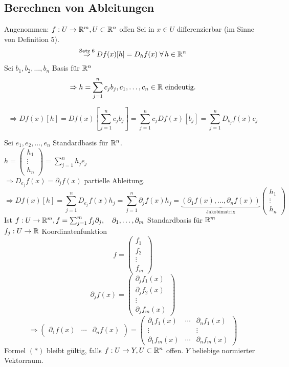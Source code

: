 \documentclass[../ana2.tex]{subfiles}
\begin{document}
\subsection{Berechnen von Ableitungen}
Angenommen: \( f:U\rightarrow \mathbb{R}^m, U \subset \mathbb{R}^n \) offen
Sei in \( x \in U \) differenzierbar (im Sinne von Definition 5).
\[ \oversett{Satz 6}{\Rightarrow} Df(x)[h] = D_hf(x) \; \forall h \in \R^n \]
Sei \( b_1, b_2, \dots, b_n \) Basis für \( \mathbb{R}^n \)
\[ \Rightarrow h = \sum_{j=1}^n c_j b_j, c_1, \ldots, c_n \in \mathbb{R} \text{ eindeutig.} \]

\[ \Rightarrow Df(x)[h] = Df(x)[\sum_{j=1}^n c_j b_j]
= \sum_{j=1}^n  c_j Df(x)[b_j]
= \sum_{j=1}^n D_{b_j} f(x)c_j \]

Sei \( e_1, e_2, \dots, e_n \) Standardbasis für \(\mathbb{R}^n\).\\
\( h = \begin{pmatrix}
    h_1 \\
    \vdots\\
    h_n
\end{pmatrix} = \sum_{j=1}^n h_je_j \) \\
\( \Rightarrow D_{e_j}f(x) = \partial_j f(x) \) partielle Ableitung.
\[ \Rightarrow Df(x)[h] = \sum_{j=1}^n D_{e_j}f(x)h_j 
= \sum_{j=1}^n \partial_j f(x)h_j
= \underbrace{(\partial_1f(x), \dots, \partial_n f(x))}_{\text{Jakobimatrix}}
\begin{pmatrix}
    h_1 \\
    \vdots \\
    h_n    
\end{pmatrix} \tag{*}\]
Ist \( f:U\rightarrow \mathbb{R}^m, f = \sum_{j=1}^m f_j \partial_j, \quad 
\partial_1, \ldots, \partial_m \) Standardbasis für \( \mathbb{R}^m \) \\
\( f_j:U\rightarrow \mathbb{R} \) Koordinatenfunktion
\[ f = \begin{pmatrix}
    f_1 \\
    f_2 \\
    \vdots \\
    f_m
\end{pmatrix} \]
\[ \partial_j f(x) = \begin{pmatrix}
    \partial_j f_1(x) \\
    \partial_j f_2(x) \\
    \vdots \\
    \partial_j f_m(x)
\end{pmatrix} \]
\[ \Rightarrow \begin{pmatrix}
    \partial_1 f(x) & \cdots &\partial_n f(x)
\end{pmatrix} 
= \begin{pmatrix}
    \partial_1 f_1(x) & \cdots & \partial_n f_1(x) \\
    \vdots & & \vdots \\
    \partial_1 f_m(x) & \cdots & \partial_n f_m(x)
\end{pmatrix} \]
Formel \((*)\) bleibt gültig, falls \( f:U\rightarrow Y, U \subset \mathbb{R}^n \)
offen. \( Y\) beliebige normierter Vektorraum. 
\end{document}
